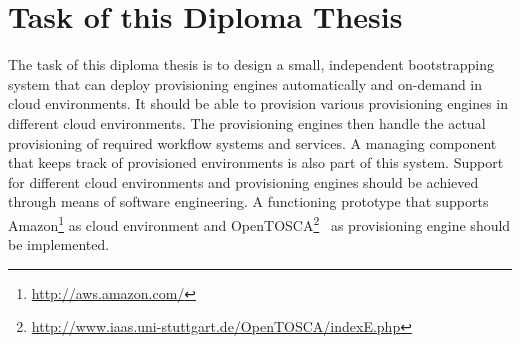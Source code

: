 \section{Task of this Diploma Thesis}

The task of this diploma thesis is to design a small, independent bootstrapping system that can deploy provisioning engines automatically and on-demand in cloud environments.
It should be able to provision various provisioning engines in different cloud environments.
The provisioning engines then handle the actual provisioning of required workflow systems and services.
A managing component that keeps track of provisioned environments is also part of this system.
Support for different cloud environments and provisioning engines should be achieved through means of software engineering.
A functioning prototype that supports Amazon\footnote{\url{http://aws.amazon.com/}} as cloud environment and OpenTOSCA\footnote{\url{http://www.iaas.uni-stuttgart.de/OpenTOSCA/indexE.php}}~\autocite{opentosca} as provisioning engine should be implemented.
